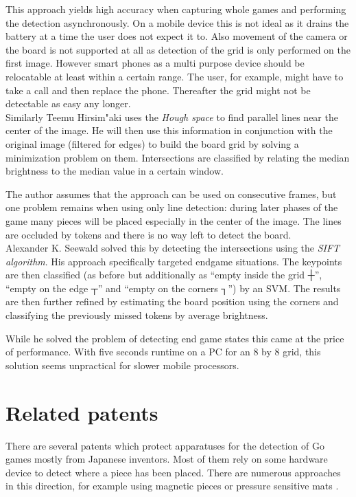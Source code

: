 	This approach yields high accuracy when capturing whole games and performing the detection asynchronously. On a mobile device this is not ideal as it drains the battery at a time the user does not expect it to. Also movement of the camera or the board is not supported at all as detection of the grid is only performed on the first image. However smart phones as a multi purpose device should be relocatable at least within a certain range. The user, for example, might have to take a call and then replace the phone. Thereafter the grid might not be detectable as easy any longer.
	\\

	Similarly Teemu Hirsim"aki \cite{hirsimaki2005extracting} uses the \emph{Hough space} to find parallel lines near the center of the image. He will then use this information in conjunction with the original image (filtered for edges) to build the board grid by solving a minimization problem on them. Intersections are classified by relating the median brightness to the median value in a certain window.

	The author assumes that the approach can be used on consecutive frames, but one problem remains when using only line detection: during later phases of the game many pieces will be placed especially in the center of the image. The lines are occluded by tokens and there is no way left to detect the board.
	\\

	Alexander K. Seewald \cite{seewald2010automatic} solved this by detecting the intersections using the \emph{SIFT algorithm}. His approach specifically targeted endgame situations. The keypoints are then classified (as before but additionally as ``empty inside the grid ┼'', ``empty on the edge ┬'' and ``empty on the corners ┐'') by an SVM. The results are then further refined by estimating the board position using the corners and classifying the previously missed tokens by average brightness.

	While he solved the problem of detecting end game states this came at the price of performance. With five seconds runtime on a PC for an 8 by 8 grid, this solution seems unpractical for slower mobile processors.

	\section{Related patents}
	\label{introduction-patents}

	There are several patents which protect apparatuses for the detection of Go games mostly from Japanese inventors. Most of them rely on some hardware device to detect where a piece has been placed. There are numerous approaches in this direction, for example using magnetic pieces \cite{JPH11114129A} or pressure sensitive mats \cite{JP2002000792A}.

